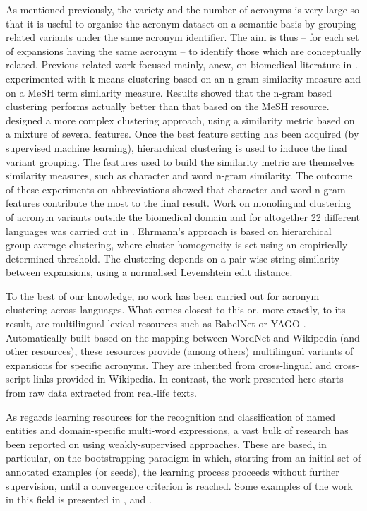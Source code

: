 \documentclass[output=paper]{langsci/langscibook}
\begin{document}
As mentioned previously, the variety and the number of acronyms is
very large so that it is useful to organise the acronym dataset on a
semantic basis by grouping related variants under the same acronym
identifier. The aim is thus -- for each set of expansions having the
same acronym -- to identify those which are conceptually
related. Previous related work focused mainly, anew, on biomedical
literature in . \citet{adar-04} experimented with k-means
clustering based on an n-gram similarity measure and on a MeSH term
similarity measure. Results showed that the n-gram based clustering
performs actually better than that based on the MeSH resource.
\citet{okazaki-10} designed a more complex clustering approach, using
a similarity metric based on a mixture of several features. Once the
best feature setting has been acquired (by supervised machine
learning), hierarchical clustering is used to induce the final variant
grouping. The features used to build the similarity metric are
themselves similarity measures, such as character and word n-gram
similarity.  The outcome of these experiments on  abbreviations
showed that character and word n-gram features contribute the most to
the final result. Work on monolingual clustering of acronym variants
outside the biomedical domain and for altogether 22 different
languages was carried out in \citet{ehrmann-13}. Ehrmann's approach is
based on hierarchical group-average clustering, where cluster
homogeneity is set using an empirically determined threshold.  The
clustering depends on a pair-wise string similarity between
expansions, using a normalised Levenshtein edit distance.

To the best of our knowledge, no work has been carried out for acronym
clustering across languages.  What comes closest to this or,
more exactly, to its result, are multilingual lexical resources such
as BabelNet \citep{navigli-12} or YAGO
\citep{hoffart-13}. Automatically built based on the mapping between
WordNet and Wikipedia (and other resources), these resources provide
(among others) multilingual variants of expansions for specific
acronyms.  They are inherited from cross-lingual and cross-script
links provided in Wikipedia.  In contrast, the work presented here
starts from raw data extracted from real-life texts.

As regards learning resources for the recognition and classification
of named entities and domain-specific multi-word expressions, a vast
bulk of research has been reported on using weakly-supervised
approaches. These are based, in particular, on the bootstrapping
paradigm in which, starting from an initial set of annotated examples
(or seeds), the learning process proceeds without further supervision,
until a convergence criterion is reached. Some examples of the work in
this field is presented in
\citet{riloff:aaai-1996,collins-singer:1999-emnlp}, and
\citet{yangarber:2002-coling}.
\end{document}
